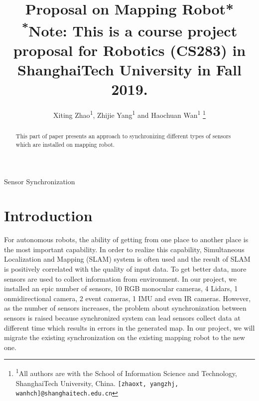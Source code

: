 \documentclass[conference]{IEEEtran}
\begin{document}
\title{Proposal on Mapping Robot*\\
{\footnotesize \textsuperscript{*}Note: This is a course project proposal for Robotics (CS283) in ShanghaiTech University in Fall 2019.}
}

\author{
Xiting Zhao\textsuperscript{1}, Zhijie Yang\textsuperscript{1} and Haochuan Wan\textsuperscript{1}
\thanks{\textsuperscript{1}All authors are with the School of Information Science and Technology, 
ShanghaiTech University, China.
        {\tt\small [zhaoxt, yangzhj, wanhch]@shanghaitech.edu.cn}}%
}

\maketitle

\begin{abstract}
This part of paper presents an approach to synchronizing different types of sensors which are installed on mapping robot.
\end{abstract}

\begin{IEEEkeywords}
Sensor Synchronization
\end{IEEEkeywords}

\section{Introduction}
For autonomous robots, the ability of getting from one place to another place is the most important capability. In order to realize this capability, Simultaneous Localization and Mapping (SLAM) system is often used and the result of SLAM is positively correlated with the quality of input data. To get better data, more sensors are used to collect information from environment. In our project, we installed an epic number of sensors, 10 RGB monocular cameras, 4 Lidars, 1 onmidirectional camera, 2 event cameras, 1 IMU and even IR cameras. However, as the number of sensors increases, the problem about synchronization between sensors is raised because synchronized system can lead sensors collect data at different time which results in errors in the generated map. In our project, we will migrate the existing synchronization on the existing mapping robot to the new one.
\end{document}
